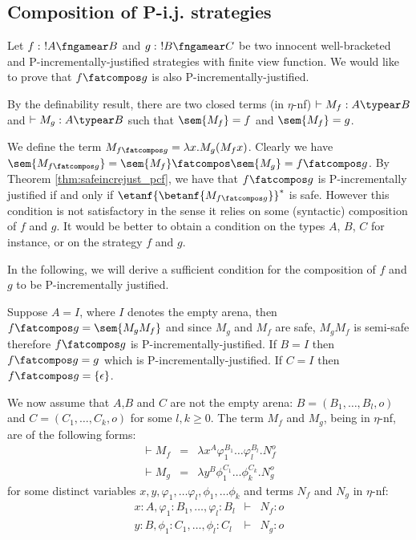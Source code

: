 \subsection{Composition of P-i.j. strategies}

Let $f:\ !A\fngamear B$ and $g:\ !B\fngamear C$ be two innocent well-bracketed and P-incrementally-justified strategies with finite view function.
We would like to prove that $f\fatcompos g$ is also P-incrementally-justified.

By the definability result, there are two closed terms (in $\eta$-nf) $\vdash M_f :A\typear B$  and $\vdash M_g :A\typear B$ such that $\sem{M_f} = f$
and $\sem{M_f} = g$.
 
We define the term $M_{f\fatcompos g} = \lambda x . M_g (M_f x)$. Clearly we have $\sem{M_{f\fatcompos g}} = \sem{M_f} \fatcompos \sem{M_g} = f\fatcompos g$. By Theorem \ref{thm:safeincrejust_pcf}, we have that $f\fatcompos g$ is P-incrementally justified if and only if $\etanf{\betanf{M_{f\fatcompos g}}}^*$ is safe. However this condition is not satisfactory in the sense it relies on some (syntactic) composition of $f$ and $g$. It would be better to obtain a condition on the types $A$, $B$, $C$ for instance, or on the strategy $f$ and $g$.

In the following, we will derive a sufficient condition for the composition of $f$ and $g$ to be P-incrementally justified.


Suppose $A=I$, where $I$ denotes the empty arena, then $f\fatcompos g = \sem{M_g M_f}$ and since $M_g$ and $M_f$ are safe, $M_g M_f$ is semi-safe therefore $f\fatcompos g$ is P-incrementally-justified.
If $B=I$ then $f\fatcompos g = g$ which is P-incrementally-justified.
If $C=I$ then $f\fatcompos g = \{ \epsilon \}$.

We now assume that $A$,$B$ and $C$ are not the empty arena: $B=(B_1,\ldots,B_l,o)$ and $C=(C_1,\ldots,C_k,o)$ for some $l,k\geq 0$. The term $M_f$ and $M_g$, being in $\eta$-nf, are of the following forms:
\begin{eqnarray*}
\vdash M_f &=& \lambda x^A \varphi_1^{B_1} \ldots \varphi_l^{B_l} . N_f^o\\
\vdash  M_g &=& \lambda y^B \phi_1^{C_1} \ldots \phi_k^{C_k} . N_g^o
\end{eqnarray*}
for some distinct variables $x,y,\varphi_1, \dots \varphi_l, \phi_1, \dots \phi_k$ and
terms $N_f$ and $N_g$ in $\eta$-nf:
\begin{eqnarray*}
x:A, \varphi_1:B_1, \dots, \varphi_l:B_l &\vdash& N_f :o \\
y:B, \phi_1:C_1, \dots, \phi_l:C_l &\vdash& N_g :o
\end{eqnarray*}


